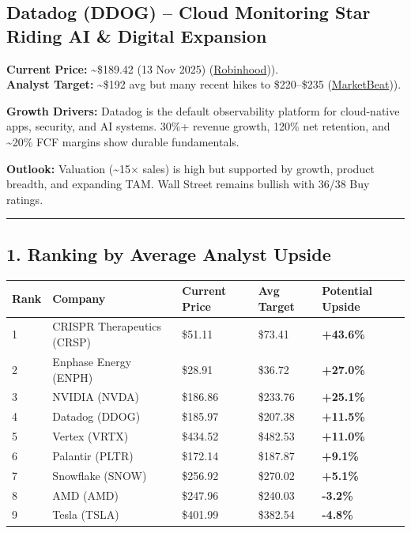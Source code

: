 \documentclass[
]{article}
\begin{document}
\hypertarget{datadog-ddog-cloud-monitoring-star-riding-ai-digital-expansion}{%
\subsection{Datadog (DDOG) -- Cloud Monitoring Star Riding AI \& Digital
Expansion}\label{datadog-ddog-cloud-monitoring-star-riding-ai-digital-expansion}}

\textbf{Current Price:} \textasciitilde\$189.42 (13 Nov 2025)
(\href{https://robinhood.com/stocks/DDOG\#:~:text=Datadog\%3A\%20DDOG\%20Stock\%20Price\%20Quote}{Robinhood})).\\
\textbf{Analyst Target:} \textasciitilde\$192 avg but many recent hikes
to \$220--\$235
(\href{https://www.marketbeat.com/instant-alerts/datadog-nasdaqddog-price-target-raised-to-23500-2025-11-08/\#:~:text=Datadog\%20,in\%20a\%20report\%20on\%20Friday}{MarketBeat})).

\textbf{Growth Drivers:} Datadog is the default observability platform
for cloud-native apps, security, and AI systems. 30\%+ revenue growth,
120\% net retention, and \textasciitilde20\% FCF margins show durable
fundamentals.

\textbf{Outlook:} Valuation (\textasciitilde15× sales) is high but
supported by growth, product breadth, and expanding TAM. Wall Street
remains bullish with 36/38 Buy ratings.

\begin{center}\rule{0.5\linewidth}{0.5pt}\end{center}

\hypertarget{ranking-by-average-analyst-upside}{%
\subsection{1. Ranking by Average Analyst
Upside}\label{ranking-by-average-analyst-upside}}

\begin{longtable}[]{@{}lllll@{}}
\toprule
Rank & Company & Current Price & Avg Target & Potential Upside \\
\midrule
\endhead
1 & CRISPR Therapeutics (CRSP) & \$51.11 & \$73.41 & \textbf{+43.6\%} \\
2 & Enphase Energy (ENPH) & \$28.91 & \$36.72 & \textbf{+27.0\%} \\
3 & NVIDIA (NVDA) & \$186.86 & \$233.76 & \textbf{+25.1\%} \\
4 & Datadog (DDOG) & \$185.97 & \$207.38 & \textbf{+11.5\%} \\
5 & Vertex (VRTX) & \$434.52 & \$482.53 & \textbf{+11.0\%} \\
6 & Palantir (PLTR) & \$172.14 & \$187.87 & \textbf{+9.1\%} \\
7 & Snowflake (SNOW) & \$256.92 & \$270.02 & \textbf{+5.1\%} \\
8 & AMD (AMD) & \$247.96 & \$240.03 & \textbf{-3.2\%} \\
9 & Tesla (TSLA) & \$401.99 & \$382.54 & \textbf{-4.8\%} \\
\bottomrule
\end{longtable}
\end{document}
